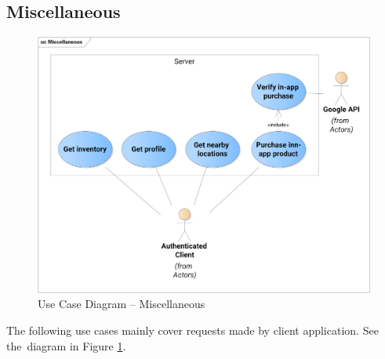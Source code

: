 	\subsection{Miscellaneous}
	\begin{figure}[h]	
		\includegraphics[width=\textwidth]{figures/UC_Miscellaneous}
		\centering			
		\caption{Use Case Diagram -- Miscellaneous}
		\label{fig:ucmisc}
	\end{figure}
	The following use cases mainly cover requests made by client application. See the~diagram in Figure \ref{fig:ucmisc}.
